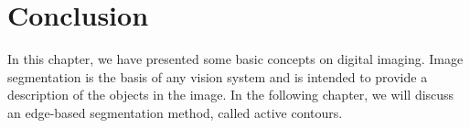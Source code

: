 \section{Conclusion}\label{sec:conclusion}
In this chapter, we have presented some basic concepts on digital imaging.
Image segmentation is the basis of any vision system and is intended to provide a description of the objects in the image.
In the following chapter, we will discuss an edge-based segmentation method, called active contours.